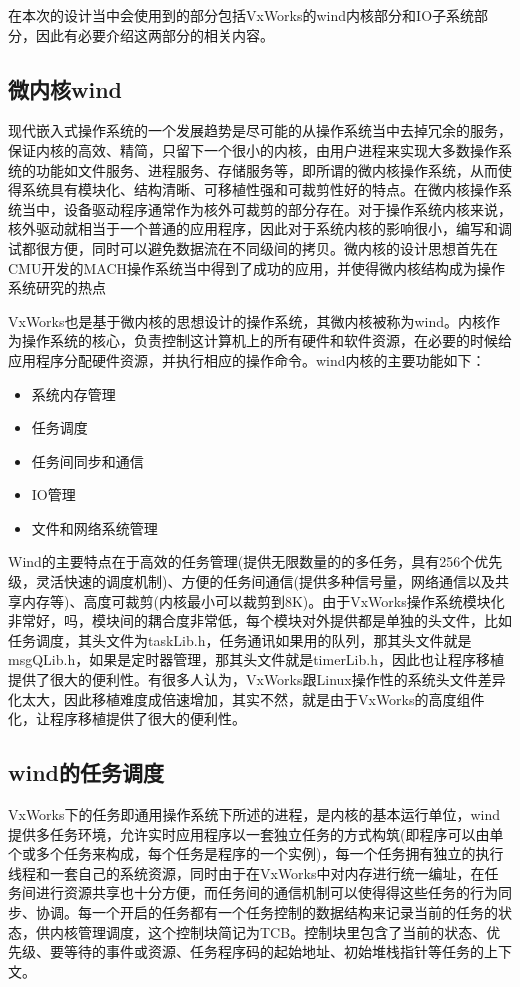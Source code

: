 在本次的设计当中会使用到的部分包括VxWorks的wind内核部分和IO子系统部分，因此有必要介绍这两部分的相关内容。
	
\subsection{微内核wind}
	现代嵌入式操作系统的一个发展趋势是尽可能的从操作系统当中去掉冗余的服务，保证内核的高效、精简，只留下一个很小的内核，由用户进程来实现大多数操作系统的功能如文件服务、进程服务、存储服务等，即所谓的微内核操作系统，从而使得系统具有模块化、结构清晰、可移植性强和可裁剪性好的特点。在微内核操作系统当中，设备驱动程序通常作为核外可裁剪的部分存在。对于操作系统内核来说，核外驱动就相当于一个普通的应用程序，因此对于系统内核的影响很小，编写和调试都很方便，同时可以避免数据流在不同级间的拷贝。微内核的设计思想首先在CMU开发的MACH操作系统当中得到了成功的应用，并使得微内核结构成为操作系统研究的热点\cite{Black1992Microkernel}
		
	VxWorks也是基于微内核的思想设计的操作系统，其微内核被称为wind。内核作为操作系统的核心，负责控制这计算机上的所有硬件和软件资源，在必要的时候给应用程序分配硬件资源，并执行相应的操作命令。wind内核的主要功能如下：
\begin{itemize}
\item 系统内存管理

\item 任务调度

\item 任务间同步和通信

\item IO管理

\item 文件和网络系统管理
\end{itemize}

	Wind的主要特点在于高效的任务管理(提供无限数量的的多任务，具有256个优先级，灵活快速的调度机制)、方便的任务间通信(提供多种信号量，网络通信以及共享内存等)、高度可裁剪(内核最小可以裁剪到8K)。由于VxWorks操作系统模块化非常好，吗，模块间的耦合度非常低，每个模块对外提供都是单独的头文件，比如任务调度，其头文件为taskLib.h，任务通讯如果用的队列，那其头文件就是msgQLib.h，如果是定时器管理，那其头文件就是timerLib.h，因此也让程序移植提供了很大的便利性。有很多人认为，VxWorks跟Linux操作性的系统头文件差异化太大，因此移植难度成倍速增加，其实不然，就是由于VxWorks的高度组件化，让程序移植提供了很大的便利性。

\subsection{wind的任务调度}
	VxWorks下的任务即通用操作系统下所述的进程，是内核的基本运行单位，wind提供多任务环境，允许实时应用程序以一套独立任务的方式构筑(即程序可以由单个或多个任务来构成，每个任务是程序的一个实例)，每一个任务拥有独立的执行线程和一套自己的系统资源，同时由于在VxWorks中对内存进行统一编址，在任务间进行资源共享也十分方便，而任务间的通信机制可以使得得这些任务的行为同步、协调。每一个开启的任务都有一个任务控制的数据结构来记录当前的任务的状态，供内核管理调度，这个控制块简记为TCB。控制块里包含了当前的状态、优先级、要等待的事件或资源、任务程序码的起始地址、初始堆栈指针等任务的上下文。
		
